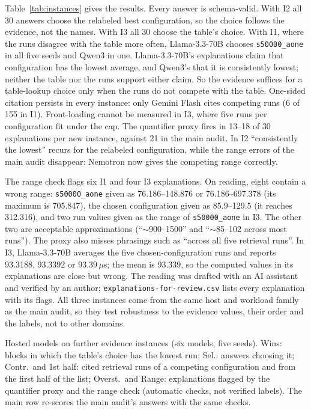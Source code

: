 Table~\ref{tab:instances} gives the results. Every answer is schema-valid. With I2 all 30 answers choose the relabeled best configuration, so the choice follows the evidence, not the names. With I3 all 30 choose the table's choice. With I1, where the runs disagree with the table more often, Llama-3.3-70B chooses \texttt{s50000\_aone} in all five seeds and Qwen3 in one. Llama-3.3-70B's explanations claim that configuration has the lowest average, and Qwen3's that it is consistently lowest; neither the table nor the runs support either claim. So the evidence suffices for a table-lookup choice only when the runs do not compete with the table. One-sided citation persists in every instance: only Gemini Flash cites competing runs (6 of 155 in I1). Front-loading cannot be measured in I3, where five runs per configuration fit under the cap. The quantifier proxy fires in 13--18 of 30 explanations per new instance, against 21 in the main audit. In I2 ``consistently the lowest'' recurs for the relabeled configuration, while the range errors of the main audit disappear: Nemotron now gives the competing range correctly.

The range check flags six I1 and four I3 explanations. On reading, eight contain a wrong range: \texttt{s50000\_aone} given as 76.186--148.876 or 76.186--697.378 (its maximum is 705.847), the chosen configuration given as 85.9--129.5 (it reaches 312.316), and two run values given as the range of \texttt{s50000\_aone} in I3. The other two are acceptable approximations (``$\sim$900--1500'' and ``$\sim$85--102 across most runs''). The proxy also misses phrasings such as ``across all five retrieval runs''. In I3, Llama-3.3-70B averages the five chosen-configuration runs and reports 93.3188, 93.3392 or 93.39\,$\mu$s; the mean is 93.339, so the computed values in its explanations are close but wrong. The reading was drafted with an AI assistant and verified by an author; \texttt{explanations-for-review.csv} lists every explanation with its flags. All three instances come from the same host and workload family as the main audit, so they test robustness to the evidence values, their order and the labels, not to other domains.

\begin{table}[h]
\centering\footnotesize\setlength{\tabcolsep}{3pt}
\caption{Hosted models on further evidence instances (six models, five seeds). Wins: blocks in which the table's choice has the lowest run; Sel.: answers choosing it; Contr.\ and 1st half: cited retrieval runs of a competing configuration and from the first half of the list; Overst.\ and Range: explanations flagged by the quantifier proxy and the range check (automatic checks, not verified labels). The main row re-scores the main audit's answers with the same checks.}
\label{tab:instances}
\begin{adjustbox}{max width=\columnwidth}

\end{adjustbox}
\end{table}

